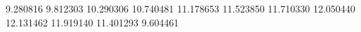 9.280816
9.812303
10.290306
10.740481
11.178653
11.523850
11.710330
12.050440
12.131462
11.919140
11.401293
9.604461
